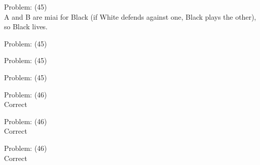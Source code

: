 \documentclass[11pt]{article}
\begin{document}
\begin{minipage}[t]{0.5\textwidth}
  {\centering
  
  Problem: (45)\\
  A and B are miai for Black (if White defends against one, Black plays the other), so Black lives.\\
  }
\end{minipage}
\begin{minipage}[t]{0.5\textwidth}
  {\centering
  
  Problem: (45)\\
  
  }
\end{minipage}
\begin{minipage}[t]{0.5\textwidth}
  {\centering
  
  Problem: (45)\\
  
  }
\end{minipage}
\begin{minipage}[t]{0.5\textwidth}
  {\centering
  
  Problem: (45)\\
  
  }
\end{minipage}
\begin{minipage}[t]{0.5\textwidth}
  {\centering
  
  Problem: (46)\\
  Correct\\
  }
\end{minipage}
\begin{minipage}[t]{0.5\textwidth}
  {\centering
  
  Problem: (46)\\
  Correct\\
  }
\end{minipage}
\begin{minipage}[t]{0.5\textwidth}
  {\centering
  
  Problem: (46)\\
  Correct\\
  }
\end{minipage}
\end{document}
